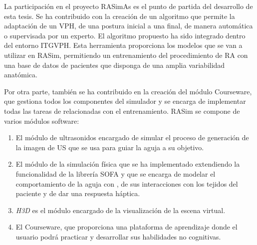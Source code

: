 La participación en el proyecto \ac{RASimAs} es el punto de partida del desarrollo de esta tesis. Se ha contribuido con la creación de un algoritmo que permite la adaptación de un \ac{VPH}, de una postura inicial a una final, de manera automática o supervisada por un experto.
El algoritmo propuesto ha sido integrado dentro del entorno \ac{ITGVPH}.
Esta herramienta proporciona los modelos que se van a utilizar en \ac{RASim}, permitiendo un entrenamiento del procedimiento de \ac{RA} con una base de datos de pacientes que disponga de una amplia variabilidad anatómica.

Por otra parte, también se ha contribuido en la creación del módulo \ac{Courseware}, que gestiona todos los componentes del simulador y se encarga de implementar todas las tareas de relacionadas con el entrenamiento. \ac{RASim} se compone de varios módulos software:
\begin{enumerate}
    \item El módulo de ultrasonidos \cite{Law2015} encargado de simular el proceso de generación de la imagen de \ac{US} que se usa para guiar la aguja a su objetivo.
    \item El módulo de la simulación física que se ha implementado extendiendo la funcionalidad de la librería \ac{SOFA}\cite{sofaweb} y que se encarga de modelar el comportamiento de la aguja con \cite{needleinsertion}, de sus interacciones con los tejidos del paciente y de dar una respuesta háptica.
    \item \emph{H3D} \cite{sensegraphics2012open} es el módulo encargado de la visualización de la escena virtual.
    \item El \ac{Courseware}, que proporciona una plataforma de aprendizaje donde el usuario podrá practicar y desarrollar sus habilidades no cognitivas.
\end{enumerate}



